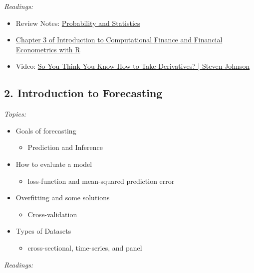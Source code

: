 \documentclass[12pt]{article}
\begin{document}
\bigskip
\noindent\emph{Readings:}

\begin{itemize}
  \item Review Notes: \href{https://nbviewer.org/github/kylebutts/UARK_5753/blob/main/00-Review_Probability_and_Statistics/Review_Probability_and_Statistics.pdf}{Probability and Statistics}

  \item \href{https://bookdown.org/compfinezbook/introcompfinr/Matrix-Algebra-Review.html}{Chapter 3 of Introduction to Computational Finance and Financial Econometrics with R}

  \item Video: \href{https://www.youtube.com/watch?v=-l7JHalBubw}{So You Think You Know How to Take Derivatives? | Steven Johnson}
\end{itemize}


\subsection*{2. Introduction to Forecasting}

\noindent\emph{Topics:}

\begin{itemize}
  \item Goals of forecasting
  \begin{itemize}
    \item Prediction and Inference
  \end{itemize}

  \item How to evaluate a model
  \begin{itemize}
    \item loss-function and mean-squared prediction error
  \end{itemize}

  \item Overfitting and some solutions
  \begin{itemize}
    \item Cross-validation
  \end{itemize}

  \item Types of Datasets
  \begin{itemize}
    \item cross-sectional, time-series, and panel
  \end{itemize}
\end{itemize}

\bigskip
\noindent\emph{Readings:}
\end{document}
